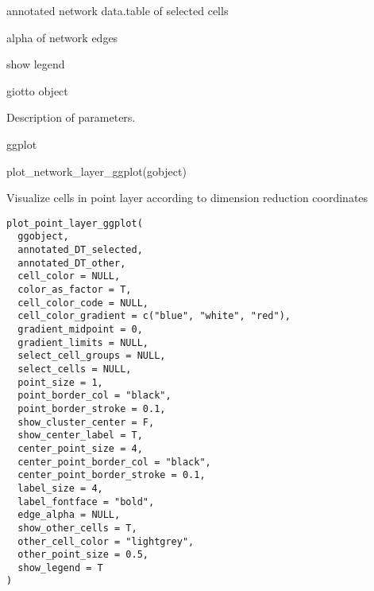 \documentclass[a4paper]{book}
\begin{document}
%
\begin{Arguments}
\begin{ldescription}
\item[\code{annotated\_network\_DT}] annotated network data.table of selected cells

\item[\code{edge\_alpha}] alpha of network edges

\item[\code{show\_legend}] show legend

\item[\code{gobject}] giotto object
\end{ldescription}
\end{Arguments}
%
\begin{Details}\relax
Description of parameters.
\end{Details}
%
\begin{Value}
ggplot
\end{Value}
%
\begin{Examples}
\begin{ExampleCode}
    plot_network_layer_ggplot(gobject)
\end{ExampleCode}
\end{Examples}
%
\begin{Description}\relax
Visualize cells in point layer according to dimension reduction coordinates
\end{Description}
%
\begin{Usage}
\begin{verbatim}
plot_point_layer_ggplot(
  ggobject,
  annotated_DT_selected,
  annotated_DT_other,
  cell_color = NULL,
  color_as_factor = T,
  cell_color_code = NULL,
  cell_color_gradient = c("blue", "white", "red"),
  gradient_midpoint = 0,
  gradient_limits = NULL,
  select_cell_groups = NULL,
  select_cells = NULL,
  point_size = 1,
  point_border_col = "black",
  point_border_stroke = 0.1,
  show_cluster_center = F,
  show_center_label = T,
  center_point_size = 4,
  center_point_border_col = "black",
  center_point_border_stroke = 0.1,
  label_size = 4,
  label_fontface = "bold",
  edge_alpha = NULL,
  show_other_cells = T,
  other_cell_color = "lightgrey",
  other_point_size = 0.5,
  show_legend = T
)
\end{verbatim}
\end{Usage}
%
\end{document}

